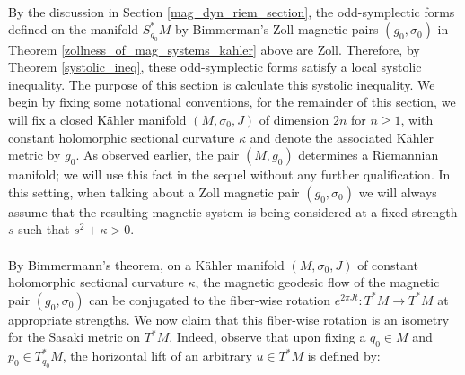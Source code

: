 \documentclass[11pt]{amsart}
\theoremstyle{plain}
\theoremstyle{definition}
\theoremstyle{remark}
\begin{document}
\\
By the discussion in Section \ref{mag_dyn_riem_section}, the odd-symplectic forms defined on the manifold $S^*_{g_0}M$ by Bimmerman's Zoll magnetic pairs $(g_0,\sigma_0)$ in Theorem \ref{zollness_of_mag_systems_kahler} above are Zoll. Therefore, by Theorem \ref{systolic_ineq}, these odd-symplectic forms satisfy a local systolic inequality. The purpose of this section is calculate this systolic inequality. We begin by fixing some notational conventions,
for the remainder of this section, we will fix a closed K\"ahler manifold $(M, \sigma_0,J)$ of dimension $2n$ for $n\geq 1$, with constant holomorphic sectional curvature $\kappa$ and denote the associated K\"ahler metric by $g_0$. As observed earlier, the pair $(M,g_0)$ determines a Riemannian manifold; we will use this fact in the sequel without any further qualification. In this setting, when talking about a Zoll magnetic pair $(g_0,\sigma_0)$ we will always assume that the resulting magnetic system is being considered at a fixed strength $s$ such that $s^2+\kappa >0$.\\
\\ 
By Bimmermann's theorem, on a K\"ahler manifold $(M,\sigma_0,J)$ of constant holomorphic sectional curvature $\kappa$, the magnetic geodesic flow of the magnetic pair $(g_0,\sigma_0)$ can be conjugated to the fiber-wise rotation $e^{2\pi Jt}: T^*M \rightarrow T^*M$ at appropriate strengths. We now claim that this fiber-wise rotation is an isometry for the Sasaki metric on $T^*M$. Indeed, observe that upon fixing a $q_0 \in M$ and $p_0 \in T_{q_0}^*M$, the horizontal lift of an arbitrary $u \in T^*M$ is defined by:
\end{document}
